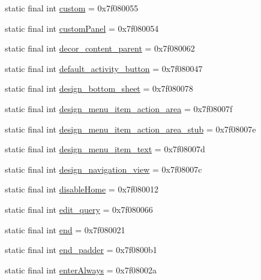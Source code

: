 \begin{CompactItemize}
\item 
static final int \hyperlink{classandroid_1_1support_1_1v4_1_1_r_1_1id_9232f2f9ca439027525c580665e2e667}{custom} = 0x7f080055
\item 
static final int \hyperlink{classandroid_1_1support_1_1v4_1_1_r_1_1id_c357e6fe025afd109dbef3fc169cd9f7}{customPanel} = 0x7f080054
\item 
static final int \hyperlink{classandroid_1_1support_1_1v4_1_1_r_1_1id_70b0cb6a9428f0b89b7e8c51f629dad1}{decor\_\-content\_\-parent} = 0x7f080062
\item 
static final int \hyperlink{classandroid_1_1support_1_1v4_1_1_r_1_1id_c02af64928033863ab3f87e14bc987e2}{default\_\-activity\_\-button} = 0x7f080047
\item 
static final int \hyperlink{classandroid_1_1support_1_1v4_1_1_r_1_1id_002e7de49424f130d1c3707bb7c335c6}{design\_\-bottom\_\-sheet} = 0x7f080078
\item 
static final int \hyperlink{classandroid_1_1support_1_1v4_1_1_r_1_1id_b76e964b263c6a6a5b6a55023772424b}{design\_\-menu\_\-item\_\-action\_\-area} = 0x7f08007f
\item 
static final int \hyperlink{classandroid_1_1support_1_1v4_1_1_r_1_1id_57fa3640bbb46c5ab2212094bfe4105f}{design\_\-menu\_\-item\_\-action\_\-area\_\-stub} = 0x7f08007e
\item 
static final int \hyperlink{classandroid_1_1support_1_1v4_1_1_r_1_1id_cdfe6893d2df467c1c8cc1d698ac4a0a}{design\_\-menu\_\-item\_\-text} = 0x7f08007d
\item 
static final int \hyperlink{classandroid_1_1support_1_1v4_1_1_r_1_1id_6ba6499a99dc998240dd51eafb28325a}{design\_\-navigation\_\-view} = 0x7f08007c
\item 
static final int \hyperlink{classandroid_1_1support_1_1v4_1_1_r_1_1id_c30546a20a8222c5bd1b45d3c731137c}{disableHome} = 0x7f080012
\item 
static final int \hyperlink{classandroid_1_1support_1_1v4_1_1_r_1_1id_c1381b0bdbb2baefbb1627b03b168924}{edit\_\-query} = 0x7f080066
\item 
static final int \hyperlink{classandroid_1_1support_1_1v4_1_1_r_1_1id_e30e59c14142226ef54b4047de3e9908}{end} = 0x7f080021
\item 
static final int \hyperlink{classandroid_1_1support_1_1v4_1_1_r_1_1id_27ba517bc3fad6ce586caac6ff598bf7}{end\_\-padder} = 0x7f0800b1
\item 
static final int \hyperlink{classandroid_1_1support_1_1v4_1_1_r_1_1id_402641f8f4c737e1ddd88b368aaf5a6c}{enterAlways} = 0x7f08002a

\end{CompactItemize}
